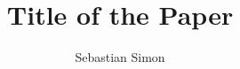 \documentclass[sigconf,review,anonymous]{acmart}
\title{Title of the Paper}
\author{Sebastian Simon}
\affiliation{%
    \institution{Leipzig University}
    \country{Germany}
}
\begin{document}


\maketitle













\begin{acks}
\end{acks}



\end{document}
